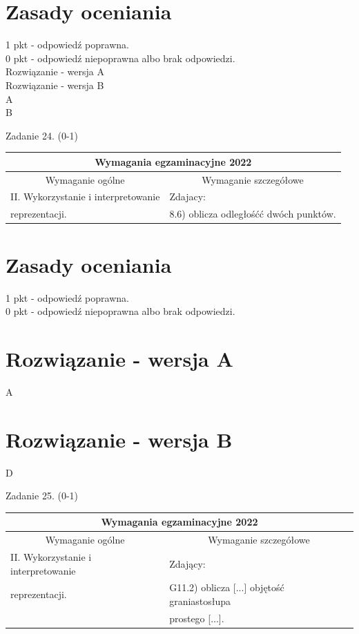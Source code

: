\documentclass[10pt]{article}
\begin{document}
\section*{Zasady oceniania}
1 pkt - odpowiedź poprawna.\\
0 pkt - odpowiedź niepoprawna albo brak odpowiedzi.\\
Rozwiązanie - wersja A\\
Rozwiązanie - wersja B\\
A\\
B

Zadanie 24. (0-1)

\begin{center}
\begin{tabular}{|l|l|}
\hline
\multicolumn{2}{|c|}{Wymagania egzaminacyjne 2022} \\
\hline
\multicolumn{1}{|c|}{Wymaganie ogólne} & \multicolumn{1}{c|}{Wymaganie szczegółowe} \\
\hline
II. Wykorzystanie i interpretowanie & Zdajacy: \\
reprezentacji. & 8.6) oblicza odległośćć dwóch punktów. \\
\hline
\end{tabular}
\end{center}

\section*{Zasady oceniania}
1 pkt - odpowiedź poprawna.\\
0 pkt - odpowiedź niepoprawna albo brak odpowiedzi.

\section*{Rozwiązanie - wersja A}
A

\section*{Rozwiązanie - wersja B}
D

Zadanie 25. (0-1)

\begin{center}
\begin{tabular}{|l|l|}
\hline
\multicolumn{2}{|c|}{Wymagania egzaminacyjne 2022} \\
\hline
\multicolumn{1}{|c|}{Wymaganie ogólne} & \multicolumn{1}{c|}{Wymaganie szczegółowe} \\
\hline
II. Wykorzystanie i interpretowanie & Zdający: \\
reprezentacji. & G11.2) oblicza [...] objętość graniastosłupa \\
 & prostego [...]. \\
\hline
\end{tabular}
\end{center}
\end{document}
